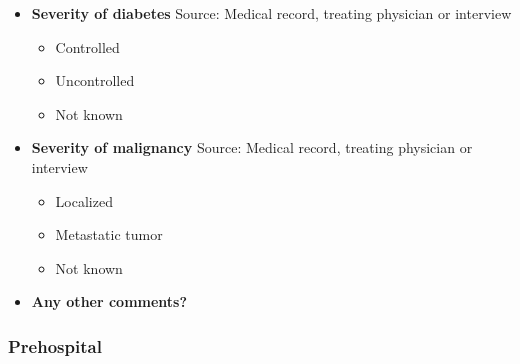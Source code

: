 \documentclass[
]{scrartcl}
\providecommand{\tightlist}{%
  \setlength{\itemsep}{0pt}\setlength{\parskip}{0pt}}\usepackage{longtable,booktabs,array}
\begin{document}
\begin{itemize}
  \begin{itemize}
  \tightlist
  \item
    Mild
  \item
    Moderate or severe
  \item
    Not known
  \end{itemize}
\item
  \textbf{Severity of diabetes} Source: Medical record, treating
  physician or interview

  \begin{itemize}
  \tightlist
  \item
    Controlled
  \item
    Uncontrolled
  \item
    Not known
  \end{itemize}
\item
  \textbf{Severity of malignancy} Source: Medical record, treating
  physician or interview

  \begin{itemize}
  \tightlist
  \item
    Localized
  \item
    Metastatic tumor
  \item
    Not known
  \end{itemize}
\item
  \textbf{Any other comments?}
\end{itemize}

\subsubsection{Prehospital}\label{prehospital}
\end{document}
